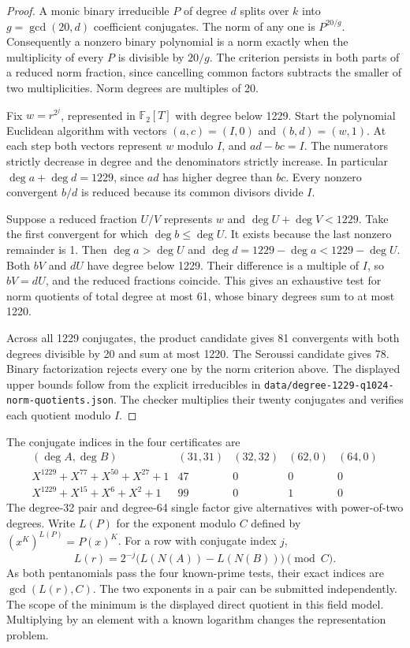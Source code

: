 \documentclass[11pt]{article}
\newcommand{\F}{\mathbb F_2}
\begin{document}
\begin{proof}
A monic binary irreducible \(P\) of degree \(d\) splits over \(k\) into
\(g=\gcd(20,d)\) coefficient conjugates. The norm of any one is
\(P^{20/g}\). Consequently a nonzero binary polynomial is a norm
exactly when the multiplicity of every \(P\) is divisible by \(20/g\).
The criterion persists in both parts of a reduced norm fraction,
since cancelling common factors subtracts the smaller of two
multiplicities. Norm degrees are multiples of 20.

Fix \(w=r^{2^j}\), represented in \(\F[T]\) with degree below 1229.
Start the polynomial Euclidean algorithm with vectors
\((a,c)=(I,0)\) and \((b,d)=(w,1)\). At each step both vectors
represent \(w\) modulo \(I\), and \(ad-bc=I\).
The numerators strictly decrease in degree and the denominators
strictly increase. In particular \(\deg a+\deg d=1229\), since
\(ad\) has higher degree than \(bc\). Every nonzero convergent
\(b/d\) is reduced because its common divisors divide \(I\).

Suppose a reduced fraction \(U/V\) represents \(w\) and
\(\deg U+\deg V<1229\). Take the first convergent for which
\(\deg b\le\deg U\). It exists because the last nonzero remainder
is 1. Then \(\deg a>\deg U\) and
\(\deg d=1229-\deg a<1229-\deg U\).
Both \(bV\) and \(dU\) have degree below 1229.
Their difference is a multiple of \(I\), so \(bV=dU\), and the reduced
fractions coincide. This gives an exhaustive test for norm quotients of
total degree at most 61, whose binary degrees sum to at most 1220.

Across all 1229 conjugates, the product candidate gives 81 convergents
with both degrees divisible by 20 and sum at most 1220. The Seroussi
candidate gives 78. Binary factorization rejects every one by the norm
criterion above. The displayed upper bounds follow from the explicit
irreducibles in \nolinkurl{data/degree-1229-q1024-norm-quotients.json}.
The checker multiplies their twenty conjugates and verifies each
quotient modulo \(I\).
\end{proof}

The conjugate indices in the four certificates are
\[
\begin{array}{c|rrrr}
(\deg A,\deg B)&(31,31)&(32,32)&(62,0)&(64,0)\\\hline
 X^{1229}+X^{77}+X^{50}+X^{27}+1&47&0&0&0\\
 X^{1229}+X^{15}+X^6+X^2+1&99&0&1&0
\end{array}
\]
The degree-32 pair and degree-64 single factor give alternatives with
power-of-two degrees. Write \(L(P)\) for the exponent modulo \(C\)
defined by \((x^K)^{L(P)}=P(x)^K\). For a row with conjugate index \(j\),
\[
 L(r)=2^{-j}\bigl(L(N(A))-L(N(B))\bigr)\pmod C.
\]
As both pentanomials pass the four known-prime tests, their exact
indices are \(\gcd(L(r),C)\). The two exponents in a pair can be
submitted independently. The scope of the minimum is the displayed
direct quotient in this field model. Multiplying by an element with
a known logarithm changes the representation problem.
\end{document}
